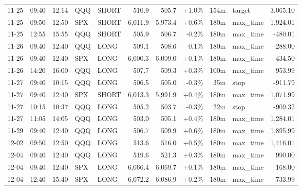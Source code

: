 \documentclass[11pt,a4paper,twoside]{article}
\begin{document}
\begin{center}
\begin{longtable}{>{\color{txtmain}}l l l l l r r r r >{\color{txtmain}}l r}
11-25 & 09:40 & 12:14 & QQQ & SHORT & 510.9 & 505.7 & \textcolor{wingreen}{+1.0\%} & 154m & target & \textcolor{wingreen}{3,065.10} \\
11-25 & 09:50 & 12:50 & SPX & SHORT & 6,011.9 & 5,973.4 & \textcolor{wingreen}{+0.6\%} & 180m & max\_time & \textcolor{wingreen}{1,924.01} \\
11-25 & 12:55 & 15:55 & QQQ & SHORT & 505.9 & 506.7 & \textcolor{lossred}{-0.2\%} & 180m & max\_time & \textcolor{lossred}{-480.01} \\
11-26 & 09:40 & 12:40 & QQQ & LONG & 509.1 & 508.6 & \textcolor{lossred}{-0.1\%} & 180m & max\_time & \textcolor{lossred}{-288.00} \\
11-26 & 09:40 & 12:40 & SPX & LONG & 6,000.3 & 6,009.0 & \textcolor{wingreen}{+0.1\%} & 180m & max\_time & \textcolor{wingreen}{434.50} \\
11-26 & 14:20 & 16:00 & QQQ & LONG & 507.7 & 509.3 & \textcolor{wingreen}{+0.3\%} & 100m & max\_time & \textcolor{wingreen}{953.99} \\
11-27 & 09:40 & 10:15 & QQQ & LONG & 506.5 & 505.0 & \textcolor{lossred}{-0.3\%} & 35m & stop & \textcolor{lossred}{-911.79} \\
11-27 & 09:40 & 12:40 & SPX & SHORT & 6,013.3 & 5,991.9 & \textcolor{wingreen}{+0.4\%} & 180m & max\_time & \textcolor{wingreen}{1,071.99} \\
11-27 & 10:15 & 10:37 & QQQ & LONG & 505.2 & 503.7 & \textcolor{lossred}{-0.3\%} & 22m & stop & \textcolor{lossred}{-909.32} \\
11-27 & 11:05 & 14:05 & QQQ & LONG & 503.0 & 505.1 & \textcolor{wingreen}{+0.4\%} & 180m & max\_time & \textcolor{wingreen}{1,284.01} \\
11-29 & 09:40 & 12:40 & QQQ & LONG & 506.7 & 509.9 & \textcolor{wingreen}{+0.6\%} & 180m & max\_time & \textcolor{wingreen}{1,895.99} \\
12-02 & 09:50 & 12:50 & QQQ & LONG & 513.6 & 516.0 & \textcolor{wingreen}{+0.5\%} & 180m & max\_time & \textcolor{wingreen}{1,416.01} \\
12-04 & 09:40 & 12:40 & QQQ & LONG & 519.6 & 521.3 & \textcolor{wingreen}{+0.3\%} & 180m & max\_time & \textcolor{wingreen}{990.00} \\
12-04 & 09:40 & 12:40 & SPX & LONG & 6,066.4 & 6,069.7 & \textcolor{wingreen}{+0.1\%} & 180m & max\_time & \textcolor{wingreen}{168.00} \\
12-04 & 12:40 & 15:40 & SPX & LONG & 6,072.2 & 6,086.9 & \textcolor{wingreen}{+0.2\%} & 180m & max\_time & \textcolor{wingreen}{733.99} \\

\end{longtable}
\end{center}
\end{document}

